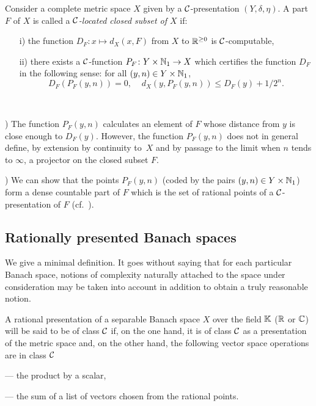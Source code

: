 \begin{definition} \label{252}
Consider a complete metric space $X$ given by a ${{\cal C}}$-presentation $(Y, \delta, \eta)$. 
A part~$F$ of $X$ is called a \emph{${{\cal C}}$-located closed subset of $X$} if:
\begin{itemize}
%
\item [i)] the function $D_F\colon x \mapsto d_X(x,F)$ from $X$ to $\mathbb {R}^{\geq 0}$ is ${{\cal C}}$-computable,
%
\item [ii)] there exists a ${{\cal C}}$-function  $P_F\colon Y \times \mathbb {N}_1\to X$ which certifies the function $D_F$ in the following sense: 
for all $(y,n) \in Y \times \mathbb {N}_1$,
\[
D_F(P_F(y,n)) = 0,\; \; \; \; d_X(y,P_F(y,n)) \leq D_F(y) + 1/2^n.
\] 
\end{itemize}
\end{definition}

\begin{remarks} \label{253}~

) The function $P_F(y,n)$ calculates an element of $F$ whose distance from $y$ is close enough to $D_F(y)$. However, the function $P_F(y,n)$ does not in general define, by extension by continuity to~$X$ and by passage to the limit when $n$ tends to $\infty$, a projector on the closed subset $F$. 

) We can show that the points $P_F(y,n)$ (coded by the pairs $(y,n) \in Y \times \mathbb {N}_1$) form a dense countable part of $F$ which is the set of rational points of a ${{\cal C}}$-presentation of $F$ (cf.\ \cite{Mo}).
\end{remarks}


\subsection{Rationally presented Banach spaces}\label{subsec26}

We give a minimal definition. It goes without saying that for each particular Banach space, notions of complexity naturally attached to the space under consideration may be taken into account in addition to obtain a truly reasonable notion. 

\begin{definition} \label{261} 
A rational presentation of a separable Banach space $X$ over the field $\mathbb {K}$ ($\mathbb {R}$ or $\mathbb {C}$) will be said to be of class ${{\cal C}}$ if, on the one hand, it is of class ${{\cal C}}$ as a presentation of the metric space and, on the other hand, the following vector space operations are in class ${{\cal C}}$

\noindent 
--- the product by a scalar,

\noindent 
--- the sum of a list of vectors chosen from the rational points.

\end{definition}

